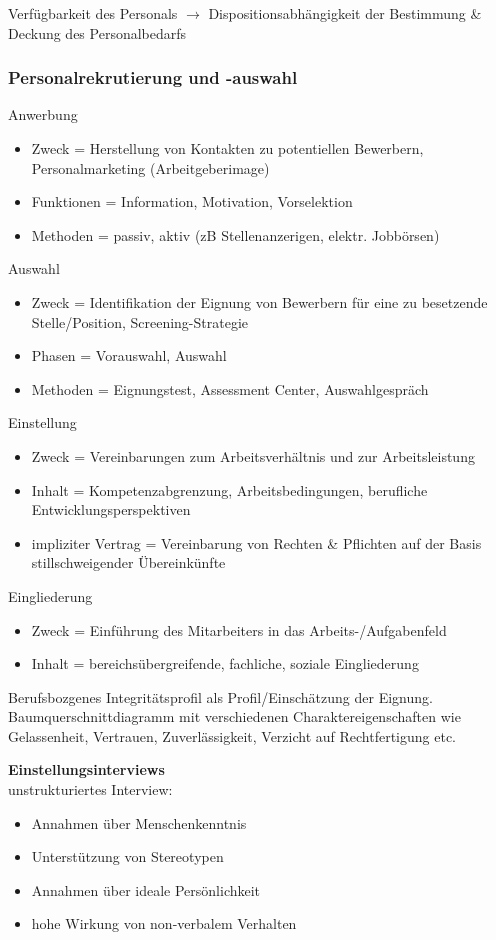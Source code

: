 \documentclass[11pt]{article}
\begin{document}
Verfügbarkeit des Personals \(\rightarrow\) Dispositionsabhängigkeit der Bestimmung \& Deckung des Personalbedarfs
\subsubsection{Personalrekrutierung und -auswahl}
\label{sec:org93870d3}
Anwerbung
\begin{itemize}
\item Zweck = Herstellung von Kontakten zu potentiellen Bewerbern, Personalmarketing (Arbeitgeberimage)
\item Funktionen = Information, Motivation, Vorselektion
\item Methoden = passiv, aktiv (zB Stellenanzerigen, elektr. Jobbörsen)
\end{itemize}

Auswahl
\begin{itemize}
\item Zweck = Identifikation der Eignung von Bewerbern für eine zu besetzende Stelle/Position, Screening-Strategie
\item Phasen = Vorauswahl, Auswahl
\item Methoden = Eignungstest, Assessment Center, Auswahlgespräch
\end{itemize}

Einstellung
\begin{itemize}
\item Zweck = Vereinbarungen zum Arbeitsverhältnis und zur Arbeitsleistung
\item Inhalt = Kompetenzabgrenzung, Arbeitsbedingungen, berufliche Entwicklungsperspektiven
\item impliziter Vertrag =  Vereinbarung von Rechten \& Pflichten auf der Basis stillschweigender Übereinkünfte
\end{itemize}

Eingliederung
\begin{itemize}
\item Zweck = Einführung des Mitarbeiters in das Arbeits-/Aufgabenfeld
\item Inhalt = bereichsübergreifende, fachliche, soziale Eingliederung
\end{itemize}

Berufsbozgenes Integritätsprofil als Profil/Einschätzung der Eignung. Baumquerschnittdiagramm mit verschiedenen Charaktereigenschaften wie Gelassenheit, Vertrauen, Zuverlässigkeit, Verzicht auf Rechtfertigung etc.

\textbf{Einstellungsinterviews}\\
unstrukturiertes Interview:
\begin{itemize}
\item Annahmen über Menschenkenntnis
\item Unterstützung von Stereotypen
\item Annahmen über ideale Persönlichkeit
\item hohe Wirkung von non-verbalem Verhalten
\end{itemize}
\end{document}
